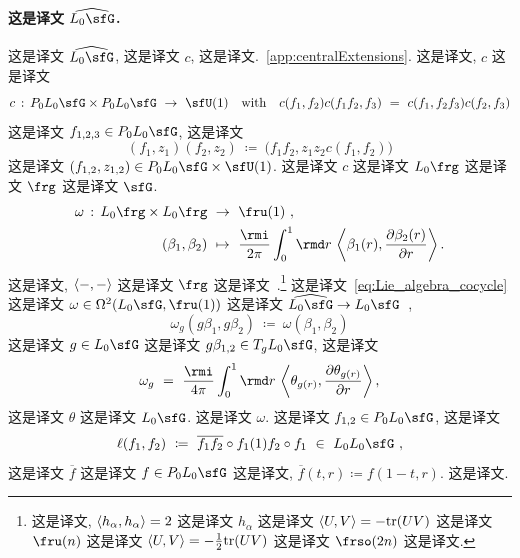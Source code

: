 \documentclass[
    affil-it, %
    auth-lg, %
    british, %
    compression, %
    contents, %
    custom-packages={}, %
    references={bigone}, %
]{lib/preprint}
\begin{document}
\begin{body}
        \paragraph{这是译文 $\widehat{L_0\sfG}$.}
 这是译文 $\widehat{L_0\sfG}$, 这是译文 $c$, 这是译文.~\cref{app:centralExtensions}. 这是译文, $c$ 这是译文         \begin{equation}\label{eq:group_cocycle}
            c\,:\,P_0L_0\sfG\times P_0L_0\sfG\ \rightarrow\ \sfU(1)
            \ewith 
            c(f_1,f_2)c(f_1f_2,f_3)\ =\ c(f_1,f_2f_3)c(f_2,f_3)
        \end{equation}  这是译文 $f_{1,2,3}\in P_0L_0\sfG$, 这是译文 
        \begin{equation}\label{eq:productOnP0L0G}
            (f_1,z_1)(f_2,z_2)\ \coloneqq\ \big(f_1f_2,z_1z_2c(f_1,f_2)\big)
        \end{equation}  这是译文 $(f_{1,2},z_{1,2})\in P_0L_0\sfG\times\sfU(1)$. 这是译文 $c$ 这是译文 $L_0\frg$ 这是译文 $\frg$ 这是译文 $\sfG$. 
        \begin{equation}\label{eq:Lie_algebra_cocycle}
            \begin{aligned}
                \omega\,:\,L_0\frg\times L_0\frg\ &\rightarrow\ \fru(1)~,
                \\
                (\beta_1,\beta_2)\ &\mapsto\ \frac{\rmi}{2\pi}\int_0^1 \rmd r\,\innerLarge{\beta_1(r)}{\parder[\beta_2(r)]{r}}.
            \end{aligned}
        \end{equation}  这是译文, $\langle-,-\rangle$ 这是译文 $\frg$ 这是译文~\cite{Pressley:1988qk}.\footnote{这是译文, $\langle h_\alpha,h_\alpha\rangle=2$ 这是译文 $h_\alpha$ 这是译文 $\langle U,V\rangle=-\mathrm{tr}(UV)$ 这是译文 $\fru(n)$ 这是译文 $\langle U,V\rangle=-\tfrac12\mathrm{tr}(UV)$ 这是译文 $\frso(2n)$ 这是译文.} 这是译文~\eqref{eq:Lie_algebra_cocycle} 这是译文 $\omega\in\Omega^2(L_0\sfG,\fru(1))$ 这是译文 $\widehat{L_0\sfG}\rightarrow L_0\sfG$~\cite{Pressley:1988qk},         \begin{equation}
            \omega_g(g\beta_1,g\beta_2)\ \coloneqq\ \omega(\beta_1,\beta_2)
        \end{equation}  这是译文 $g\in L_0\sfG$ 这是译文 $g\beta_{1,2}\in T_gL_0\sfG$, 这是译文 
        \begin{equation}\label{eq:2FormCurvatureKacMoody}
            \omega_g \ =\ \frac{\rmi}{4\pi}\int_0^1\rmd r\,\innerLarge{\theta_{g(r)}}{\parder[\theta_{g(r)}]{r}},
        \end{equation}  这是译文 $\theta$ 这是译文 $L_0\sfG$. 这是译文 $\omega$. 这是译文 $f_{1,2}\in P_0L_0\sfG$, 这是译文         \begin{equation}\label{eq:triangle}
            \ell(f_1,f_2)\ \coloneqq\ \overline{f_1f_2}\circ f_1(1)f_2\circ f_1\ \in\ L_0L_0\sfG~,
        \end{equation}  这是译文 $\overline{f}$ 这是译文 $f\in P_0L_0\sfG$ 这是译文, $\overline{f}(t,r)\coloneqq f(1-t,r)$. 这是译文.


\end{body}
\end{document}
